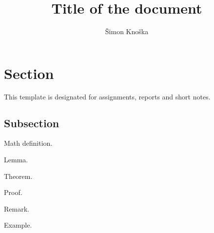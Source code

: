 \documentclass{report}
\author{Šimon Knoška}
\title{Title of the document}
\begin{document}
\section{Section}

This template is designated for assignments, reports and short notes.

\subsection{Subsection}

\begin{defn}\label{def01:1}
	Math definition.
\end{defn}

\begin{lemma}\label{lemma:1}
	Lemma.
\end{lemma}

\begin{thm}\label{thm01:1}
	Theorem.
\end{thm}

\begin{myproof}
	Proof.
\end{myproof}

\begin{remark}
	Remark.
\end{remark}

\begin{example}\label{example01:1}
	Example.
\end{example}
\end{document}
